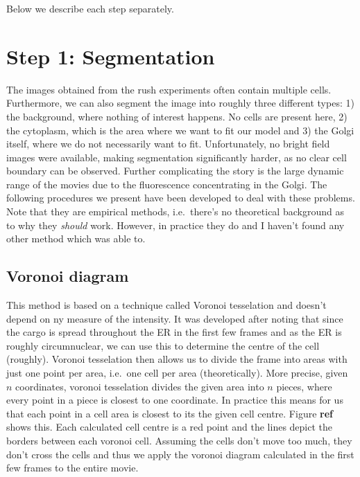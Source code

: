 \documentclass[12pt,a4paper,]{harvard-thesis}
\begin{document}
Below we describe each step separately.

\hypertarget{step-1-segmentation}{%
\section{Step 1: Segmentation}\label{step-1-segmentation}}

The images obtained from the rush experiments often contain multiple
cells. Furthermore, we can also segment the image into roughly three
different types: 1) the background, where nothing of interest happens.
No cells are present here, 2) the cytoplasm, which is the area where we
want to fit our model and 3) the Golgi itself, where we do not
necessarily want to fit. Unfortunately, no bright field images were
available, making segmentation significantly harder, as no clear cell
boundary can be observed. Further complicating the story is the large
dynamic range of the movies due to the fluorescence concentrating in the
Golgi. The following procedures we present have been developed to deal
with these problems. Note that they are empirical methods, i.e.~there's
no theoretical background as to why they \emph{should} work. However, in
practice they do and I haven't found any other method which was able to.

\hypertarget{voronoi-diagram}{%
\subsection{Voronoi diagram}\label{voronoi-diagram}}

This method is based on a technique called Voronoi tesselation and
doesn't depend on ny measure of the intensity. It was developed after
noting that since the cargo is spread throughout the ER in the first few
frames and as the ER is roughly circumnuclear, we can use this to
determine the centre of the cell (roughly). Voronoi tesselation then
allows us to divide the frame into areas with just one point per area,
i.e.~one cell per area (theoretically). More precise, given \(n\)
coordinates, voronoi tesselation divides the given area into \(n\)
pieces, where every point in a piece is closest to one coordinate. In
practice this means for us that each point in a cell area is closest to
its the given cell centre. Figure \textbf{ref} shows this. Each
calculated cell centre is a red point and the lines depict the borders
between each voronoi cell. Assuming the cells don't move too much, they
don't cross the cells and thus we apply the voronoi diagram calculated
in the first few frames to the entire movie.
\end{document}
